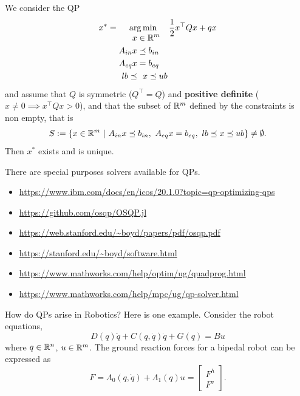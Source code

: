 \begin{tcolorbox}[title=\textbf{Useful Fact about QPs}]
We consider the QP 
\begin{equation}
    \label{eq:QPnominalForm}
        x^\ast = \operatorname*{arg\,min}_{
        \begin{aligned} x &\in \mathbb R^m \\
     A_{in} x & \preceq b_{in} \\
     A_{eq} x & = b_{eq} \\
     lb \preceq &~~x \preceq ub \end{aligned}
     } \frac{1}{2} x^\top Q x + qx
\end{equation}
and assume that $Q$ is symmetric ($Q^\top = Q$) and \textbf{positive definite} ($x \neq 0 \implies x^\top Q x >0$), and that the subset of $\mathbb R^m$ defined by the constraints is non empty, that is
\begin{equation}
    \label{eq:QPconstraintsNotEmpty}
S:=\{x \in \mathbb R^m~|~ A_{in} x  \preceq b_{in},~  A_{eq} x  = b_{eq},~ lb \preceq x \preceq ub  \} \neq \emptyset.
\end{equation} 
Then $x^\ast$ exists and is unique. 
\end{tcolorbox}
    
There are special purposes solvers available for QPs. 
\begin{itemize}
    \item \url{https://www.ibm.com/docs/en/icos/20.1.0?topic=qp-optimizing-qps}
    \item \url{https://github.com/osqp/OSQP.jl}
    \item \url{https://web.stanford.edu/~boyd/papers/pdf/osqp.pdf}
    \item \url{https://stanford.edu/~boyd/software.html}
    \item \url{https://www.mathworks.com/help/optim/ug/quadprog.html}
    \item \url{https://www.mathworks.com/help/mpc/ug/qp-solver.html}
\end{itemize}

\vspace*{.2cm} 
How do QPs arise in Robotics? Here is one example. 
Consider the robot equations,
        \begin{equation*}
            D(q)\ddot{q}+C(q,\dot{q})\dot{q}+G(q) = Bu
        \end{equation*}
    where $q \in \mathbb R^n$, $u\in \mathbb R^m$. The ground reaction forces for a bipedal robot can be expressed as
        \begin{equation*}
            F = \Lambda_0(q,\dot{q})+\Lambda_1(q)u = \left[ \begin{array}{c}
												F^h \\
                                                F^v \end{array} \right].
        \end{equation*}
        
